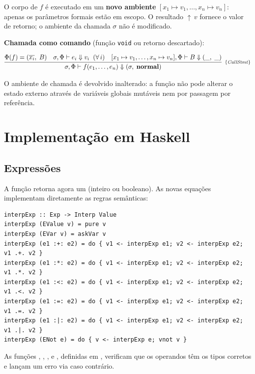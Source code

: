 O corpo de \(f\) é executado em um \textbf{novo ambiente}
\([x_1 \mapsto v_1,\ldots,x_n \mapsto v_n]\): apenas os parâmetros
formais estão em escopo. O resultado \({\uparrow}\,v\) fornece o valor
de retorno; o ambiente da chamada \(\sigma\) não é modificado.

\textbf{Chamada como comando} (função \texttt{void} ou retorno descartado):

\[
  \infer[_{\{\mathit{CallStmt}\}}]
  {\sigma,\Phi \vdash f(e_1,\ldots,e_n) \Downarrow (\sigma,\; \mathbf{normal})}
  {
    \Phi(f) = (\overline{x_i},\; B)
    \quad
    \sigma,\Phi \vdash e_i \Downarrow v_i \;\;(\forall\, i)
    \quad
    [x_1 \mapsto v_1,\ldots,x_n \mapsto v_n],\Phi \vdash B \Downarrow (\_,\; \_)
  }
\]

O ambiente de chamada é devolvido inalterado: a função não pode
alterar o estado externo através de variáveis globais mutáveis nem por
passagem por referência.

\section{Implementação em Haskell}

\subsection{Expressões}

A função  retorna agora um
 (inteiro ou booleano). As novas
equações implementam diretamente as regras semânticas:

\begin{verbatim}
interpExp :: Exp -> Interp Value
interpExp (EValue v) = pure v
interpExp (EVar v) = askVar v
interpExp (e1 :+: e2) = do { v1 <- interpExp e1; v2 <- interpExp e2; v1 .+. v2 }
interpExp (e1 :*: e2) = do { v1 <- interpExp e1; v2 <- interpExp e2; v1 .*. v2 }
interpExp (e1 :<: e2) = do { v1 <- interpExp e1; v2 <- interpExp e2; v1 .<. v2 }
interpExp (e1 :=: e2) = do { v1 <- interpExp e1; v2 <- interpExp e2; v1 .=. v2 }
interpExp (e1 :|: e2) = do { v1 <- interpExp e1; v2 <- interpExp e2; v1 .|. v2 }
interpExp (ENot e) = do { v <- interpExp e; vnot v }
\end{verbatim}

As funções ,
, ,
 e ,
definidas em , verificam que os
operandos têm os tipos corretos e lançam um erro via
 caso contrário.

